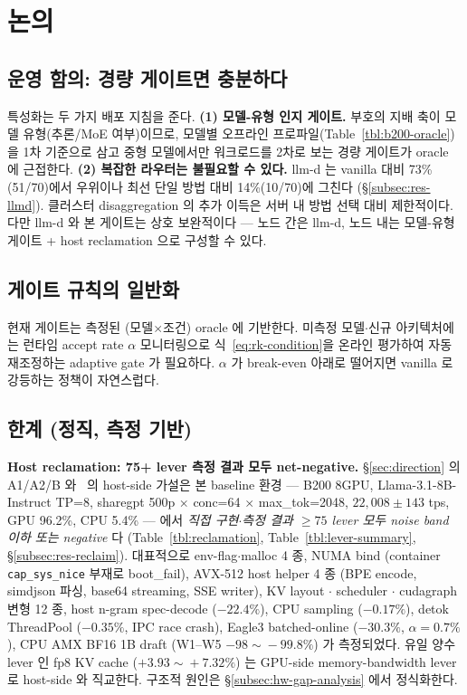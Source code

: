 
\section{논의}
\label{sec:discussion}

\subsection{운영 함의: 경량 게이트면 충분하다}

특성화는 두 가지 배포 지침을 준다.
\textbf{(1) 모델-유형 인지 게이트.} 부호의 지배 축이 모델 유형(추론/MoE 여부)이므로,
모델별 오프라인 프로파일(Table~\ref{tbl:b200-oracle})을 1차 기준으로 삼고
중형 모델에서만 워크로드를 2차로 보는 경량 게이트가 oracle 에 근접한다.
\textbf{(2) 복잡한 라우터는 불필요할 수 있다.}
llm-d 는 vanilla 대비 73\%(51/70)에서 우위이나 최선 단일 방법 대비 14\%(10/70)에 그친다
(\S\ref{subsec:res-llmd}). 클러스터 disaggregation 의 추가 이득은
서버 내 방법 선택 대비 제한적이다.
다만 llm-d 와 본 게이트는 상호 보완적이다 ---
노드 간은 llm-d, 노드 내는 모델-유형 게이트 + host reclamation 으로 구성할 수 있다.

\subsection{게이트 규칙의 일반화}

현재 게이트는 측정된 (모델$\times$조건) oracle 에 기반한다.
미측정 모델$\cdot$신규 아키텍처에는 런타임 accept rate $\alpha$ 모니터링으로
식~\ref{eq:rk-condition}을 온라인 평가하여 자동 재조정하는 adaptive gate 가 필요하다.
$\alpha$ 가 break-even 아래로 떨어지면 vanilla 로 강등하는 정책이 자연스럽다.

\subsection{한계 (정직, 측정 기반)}

\textbf{Host reclamation: 75+ lever 측정 결과 모두 net-negative.}
\S\ref{sec:direction} 의 A1/A2/B 와 \algname\ 의 host-side 가설은 본 baseline 환경 ---
B200 8GPU, Llama-3.1-8B-Instruct TP=8, sharegpt 500p $\times$ conc=64 $\times$ max\_tok=2048,
$22{,}008\!\pm\!143$ tps, GPU 96.2\%, CPU 5.4\% --- 에서
\emph{직접 구현$\cdot$측정 결과 $\ge\!75$ lever 모두 noise band 이하 또는 negative} 다
(Table~\ref{tbl:reclamation}, Table~\ref{tbl:lever-summary}, \S\ref{subsec:res-reclaim}).
대표적으로 env-flag$\cdot$malloc 4 종, NUMA bind (container \texttt{cap\_sys\_nice} 부재로 boot\_fail),
AVX-512 host helper 4 종 (BPE encode, simdjson 파싱, base64 streaming, SSE writer),
KV layout $\cdot$ scheduler $\cdot$ cudagraph 변형 12 종, host n-gram spec-decode ($-22.4\%$),
CPU sampling ($-0.17\%$), detok ThreadPool ($-0.35\%$, IPC race crash),
Eagle3 batched-online ($-30.3\%$, $\alpha\!=\!0.7\%$), CPU AMX BF16 1B draft (W1--W5 $-98\!\sim\!-99.8\%$)
가 측정되었다.
유일 양수 lever 인 fp8 KV cache ($+3.93\!\sim\!+7.32\%$) 는 GPU-side memory-bandwidth lever 로 host-side 와 직교한다.
구조적 원인은 \S\ref{subsec:hw-gap-analysis} 에서 정식화한다.

